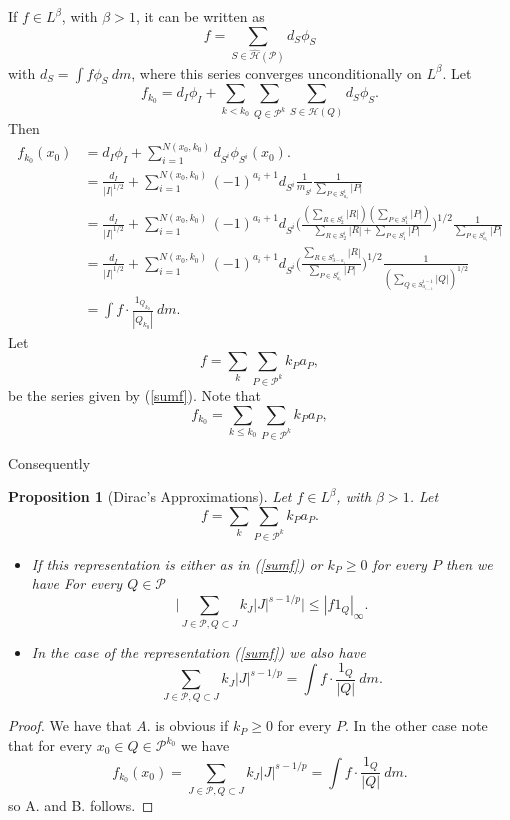 \documentclass{amsart}
\newtheorem{proposition}[theorem]{Proposition}
\theoremstyle{definition}
\begin{document}
\noindent If  $f \in L^\beta$, with $\beta > 1$,   it  can be written as 
$$f = \sum_{S\in \hat{\mathcal{H}}(\mathcal{P})} d_S\phi_S$$
with $d_S= \int f \phi_S \ dm$, where this series converges  unconditionally  on $L^\beta$. Let
\begin{equation}\label{k0} f_{k_0} = d_{I} \phi_{I}+ \sum_{k < k_0} \sum_{Q\in \mathcal{P}^k}\sum_{S\in \mathcal{H}(Q)} d_S\phi_S.\end{equation}
Then
\begin{align} f_{k_0}(x_0)  &= d_{I} \phi_{I} +\sum_{i=1}^{N(x_0,k_0)} d_{S^i} \phi_{S^i}(x_0).\nonumber \\
&=\frac{d_{I}}{|I|^{1/2}}+  \sum_{i=1}^{N(x_0,k_0)} (-1)^{a_i+1}d_{S^i}  \frac{1}{m_{S^i}}  \frac{1}{\sum_{P \in S_{a_i}^i} |P| }  \nonumber \\
&=\frac{d_{I}}{|I|^{1/2}}+\sum_{i=1}^{N(x_0,k_0)} (-1)^{a_i+1} d_{S^i}  \Big(    \frac{(\sum_{R \in S_2^i} |R| ) (\sum_{P \in S_1^i} |P|)}{\sum_{R \in S_2^i} |R| + \sum_{P \in S_1^i} |P|  }   \Big)^{1/2} \frac{1}{\sum_{P \in S_{a_i}^i} |P| }  \nonumber  \\
&=\frac{d_{I}}{|I|^{1/2}} +   \sum_{i=1}^{N(x_0,k_0)} (-1)^{a_i+1} d_{S^i}   \Big( \frac{\sum_{R \in S^{i}_{3-a_i}}|R|}{\sum_{P \in S^{i}_{a_i}} |P|}  \Big)^{1/2}  \frac{1}{(\sum_{Q \in S^{i-1}_{a_{i-1}}} |Q|)^{1/2}}   \nonumber \\
&= \int f \cdot \frac{1_{Q_{k_0}}}{|Q_{k_0}|} \ dm. \nonumber 
\end{align}
Let 
\begin{equation}\label{reep} f =  \sum_k  \sum_{P\in \mathcal{P}^{k}} k_P a_P,\end{equation}
be the series given by (\ref{sumf}). Note that
\begin{equation} f_{k_0} = \sum_{k\leq k_0}  \sum_{P\in \mathcal{P}^{k}} k_P a_P,\end{equation}

Consequently 

\begin{proposition}[Dirac's Approximations]\label{boup} Let $f \in L^\beta$, with $\beta > 1$. Let
$$ f = \sum_k  \sum_{P\in \mathcal{P}^{k}} k_P a_P.$$
\begin{itemize}
\item[A.] If  this representation is either as in (\ref{sumf}) or $k_P\geq 0$ for every $P$ then we have For every $Q \in \mathcal{P}$ 
$$\Big| \sum_{J\in \mathcal{P}, Q \subset J} k_J  |J|^{s-1/p} \Big| \leq |f1_Q|_\infty.$$
\item[B.]  In the case of the representation  (\ref{sumf}) we also have 
$$\sum_{J\in \mathcal{P}, Q \subset J} k_J  |J|^{s-1/p} =\int f \cdot \frac{1_{Q}}{|Q|} \ dm.$$
\end{itemize}
\end{proposition} 
\begin{proof} We have that $A.$ is obvious if $k_P\geq 0$ for every $P$. In the other case note that 
for  every $x_0 \in Q\in \mathcal{P}^{k_0}$ we have
 $$f_{k_0}(x_0)=\sum_{J\in \mathcal{P}, Q\subset J} k_J  |J|^{s-1/p}=  \int f \cdot \frac{1_{Q}}{|Q|} \ dm.$$
so A. and  B. follows.
\end{proof}
\end{document}
